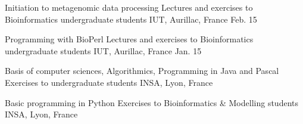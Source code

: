 \begin{cvhonors}

    \cvhonor
        {Initiation to metagenomic data processing } %
        {Lectures and exercises to Bioinformatics undergraduate students} %
        {IUT, Aurillac, France} %
        {Feb. 15} %

    \cvhonor
        {Programming with BioPerl} %
        {Lectures and exercises to Bioinformatics undergraduate students} %
        {IUT, Aurillac, France} %
        {Jan. 15} %

\end{cvhonors}


\begin{cvhonors}

    \cvhonor
        {Basis of computer sciences, Algorithmics, Programming in Java and Pascal} %
        {Exercises to undergraduate students} %
        {INSA, Lyon, France} %
        {} %

    \cvhonor
        {Basic programming in Python} %
        {Exercises to Bioinformatics \& Modelling students} %
        {INSA, Lyon, France} %
        {} %

\end{cvhonors}